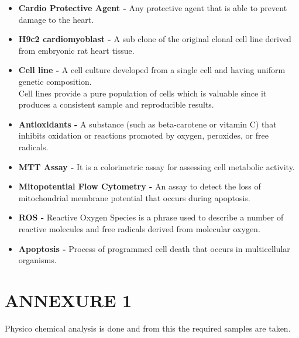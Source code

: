 \documentclass[11pt]{report} %
\begin{document}
\begin{itemize}
	\item \textbf{Cardio Protective Agent - } Any protective agent that is able to prevent damage to the heart.
	\item \textbf{H9c2 cardiomyoblast - } A sub clone of the original clonal cell line derived from embryonic rat heart tissue.
	\item \textbf{Cell line - }A cell culture developed from a single cell and having uniform genetic composition. \\
	Cell lines provide a pure population of cells which is valuable since it produces a    consistent sample and reproducible results.
	\item \textbf{Antioxidants - } A substance (such as beta-carotene or vitamin C) that inhibits oxidation or reactions promoted by oxygen, peroxides, or free radicals.	
	\item \textbf{MTT Assay - } It is a colorimetric assay for assessing cell metabolic activity.
	\item \textbf{Mitopotential Flow Cytometry - } An assay to detect the loss of mitochondrial membrane potential that occurs during apoptosis.
	\item \textbf{ROS - } Reactive Oxygen Species is a phrase used to describe a number of reactive molecules and free radicals derived from molecular oxygen.
	\item \textbf{Apoptosis - } Process of programmed cell death that occurs in multicellular organisms.
\end{itemize}



\section*{ANNEXURE 1}

Physico chemical analysis is done and from this the required samples are taken.


\end{document}
